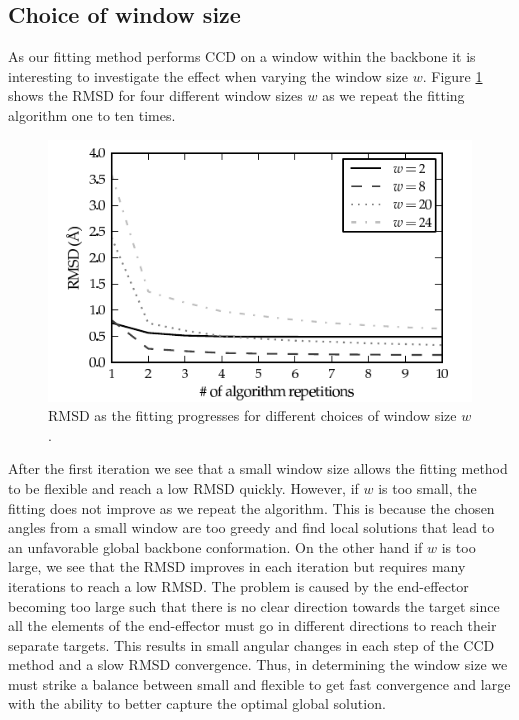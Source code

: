 \subsection{Choice of window size}
As our fitting method performs CCD on a window within the backbone it is interesting to investigate the effect when varying the window size $w$.
Figure \ref{fig:rmsd_convergence} shows the RMSD for four different window sizes $w$ as we repeat the fitting algorithm one to ten times.
\begin{figure}
	\centering
	\hspace*{-3.5mm}\includegraphics[width=1.1\columnwidth]{figures/plot_rmsd_convergence}
	\caption{RMSD as the fitting progresses for different choices of window size $w$.}
	\label{fig:rmsd_convergence}
\end{figure}
After the first iteration we see that a small window size allows the fitting method to be flexible and reach a low RMSD quickly.
However, if $w$ is too small, the fitting does not improve as we repeat the algorithm.
This is because the chosen angles from a small window are too greedy and find local solutions that lead to an unfavorable global backbone conformation.
On the other hand if $w$ is too large, we see that the RMSD improves in each iteration but requires many iterations to reach a low RMSD.
The problem is caused by the end-effector becoming too large such that there is no clear direction towards the target since all the elements of the end-effector must go in different directions to reach their separate targets.
This results in small angular changes in each step of the CCD method and a slow RMSD convergence.
Thus, in determining the window size we must strike a balance between small and flexible to get fast convergence and large with the ability to better capture the optimal global solution.
